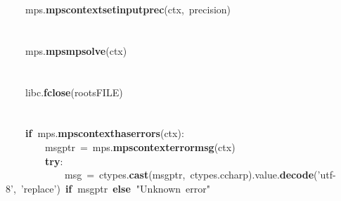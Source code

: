 \documentclass{article}\usepackage[]{graphicx}\usepackage[dvipsnames,table]{xcolor}
\makeatletter
\newcommand{\hlsng}[1]{\textcolor[rgb]{0.192,0.494,0.8}{#1}}%
\newcommand{\hlopt}[1]{\textcolor[rgb]{0,0,0}{#1}}%
\newcommand{\hldef}[1]{\textcolor[rgb]{0.345,0.345,0.345}{#1}}%
\newcommand{\hlkwa}[1]{\textcolor[rgb]{0.161,0.373,0.58}{\textbf{#1}}}%
\newcommand{\hlkwd}[1]{\textcolor[rgb]{0.737,0.353,0.396}{\textbf{#1}}}%
\newenvironment{kframe}{%
 \def\at@end@of@kframe{}%
 \ifinner\ifhmode%
  \def\at@end@of@kframe{\end{minipage}}%
  \begin{minipage}{\columnwidth}%
 \fi\fi%
 \def\FrameCommand##1{\hskip\@totalleftmargin \hskip-\fboxsep
 \colorbox{shadecolor}{##1}\hskip-\fboxsep
     \hskip-\linewidth \hskip-\@totalleftmargin \hskip\columnwidth}%
 \MakeFramed {\advance\hsize-\width
   \@totalleftmargin\z@ \linewidth\hsize
   \@setminipage}}%
 {\par\unskip\endMakeFramed%
 \at@end@of@kframe}
\newenvironment{knitrout}{}{} %
\makeatother
\begin{document}
\begin{center}
\begin{minipage}[m]{18cm}
\begin{knitrout}
\begin{kframe}
\hldef{}\hldef{\ \ \ \ }\hldef{\textunderscore mps}\hlopt{.}\hldef{}\hlkwd{mps\textunderscore context\textunderscore set\textunderscore input\textunderscore prec}\hldef{}\hlopt{(}\hldef{ctx}\hlopt{,\ }\hldef{precision}\hlopt{)}\hspace*{\fill}\\
\hldef{}\hspace*{\fill}\\
\hldef{}\hldef{\ \ \ \ }\hldef{}\hspace*{\fill}\\
\hldef{}\hldef{\ \ \ \ }\hldef{\textunderscore mps}\hlopt{.}\hldef{}\hlkwd{mps\textunderscore mpsolve}\hldef{}\hlopt{(}\hldef{ctx}\hlopt{)}\hspace*{\fill}\\
\hldef{}\hspace*{\fill}\\
\hldef{}\hldef{\ \ \ \ }\hldef{}\hspace*{\fill}\\
\hldef{}\hldef{\ \ \ \ }\hldef{\textunderscore libc}\hlopt{.}\hldef{}\hlkwd{fclose}\hldef{}\hlopt{(}\hldef{roots\textunderscore FILE}\hlopt{)}\hspace*{\fill}\\
\hldef{}\hspace*{\fill}\\
\hldef{}\hldef{\ \ \ \ }\hldef{}\hspace*{\fill}\\
\hldef{}\hldef{\ \ \ \ }\hldef{}\hlkwa{if\ }\hldef{\textunderscore mps}\hlopt{.}\hldef{}\hlkwd{mps\textunderscore context\textunderscore has\textunderscore errors}\hldef{}\hlopt{(}\hldef{ctx}\hlopt{):}\hspace*{\fill}\\
\hldef{}\hldef{\ \ \ \ \ \ \ \ }\hldef{msg\textunderscore ptr\ }\hlopt{=\ }\hldef{\textunderscore mps}\hlopt{.}\hldef{}\hlkwd{mps\textunderscore context\textunderscore error\textunderscore msg}\hldef{}\hlopt{(}\hldef{ctx}\hlopt{)}\hspace*{\fill}\\
\hldef{}\hldef{\ \ \ \ \ \ \ \ }\hldef{}\hlkwa{try}\hldef{}\hlopt{:}\hspace*{\fill}\\
\hldef{}\hldef{\ \ \ \ \ \ \ \ \ \ \ \ }\hldef{msg\ }\hlopt{=\ }\hldef{ctypes}\hlopt{.}\hldef{}\hlkwd{cast}\hldef{}\hlopt{(}\hldef{msg\textunderscore ptr}\hlopt{,\ }\hldef{ctypes}\hlopt{.}\hldef{c\textunderscore char\textunderscore p}\hlopt{).}\hldef{value}\hlopt{.}\hldef{}\hlkwd{decode}\hldef{}\hlopt{(}\hldef{}\hlsng{'utf{-}8'}\hldef{}\hlopt{,\ }\hldef{}\hlsng{'replace'}\hldef{}\hlopt{)\ }\hldef{}\hlkwa{if\ }\hldef{msg\textunderscore ptr\ }\hlkwa{else\ }\hldef{}\hlsng{"Unknown\ error"}\hldef{}\hspace*{\fill}\\

\end{kframe}
\end{knitrout}
\end{minipage}
\end{center}
\end{document}
